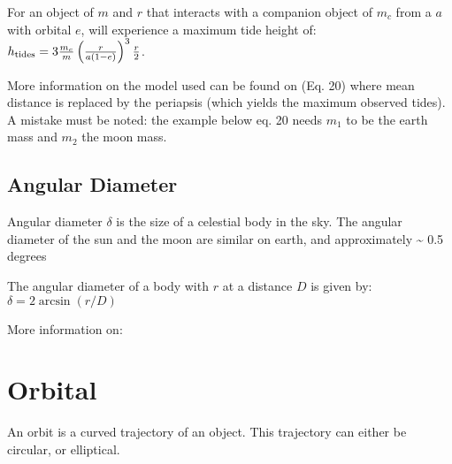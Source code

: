 \documentclass[letterpaper,10pt,english]{sphinxmanual}
\begin{document}
\sphinxAtStartPar
For an object of {\hyperref[\detokenize{quantities/material/mass:id1}]{}} \(m\) and {\hyperref[\detokenize{quantities/geometric/radius:id1}]{}} \(r\)
that interacts with a companion object of {\hyperref[\detokenize{quantities/material/mass:id1}]{}} \(m_c\)
from a {\hyperref[\detokenize{quantities/orbital/semi_major_axis:id1}]{}} \(a\)
with orbital {\hyperref[\detokenize{quantities/orbital/eccentricity:id1}]{}} \(e\),
will experience a maximum tide height of:
\(h_{\rm tides} = 3 \frac{m_c}{m} \left(\frac{r}{a (1 - e)}\right)^3 \frac{r}{2}\).

\sphinxAtStartPar
More information on the model used can be found on
 (Eq. 20)
where mean distance is replaced by the periapsis (which yields the maximum observed tides).
A mistake must be noted: the example below eq. 20 needs \(m_1\) to be the earth mass
and \(m_2\) the moon mass.


\subsection{Angular Diameter}
\label{\detokenize{quantities/surface/angular_diameter:angular-diameter}}\label{\detokenize{quantities/surface/angular_diameter::doc}}\label{\detokenize{quantities/surface/angular_diameter:id1}}
\sphinxAtStartPar
Angular diameter \(\delta\) is the size of a celestial body in the sky. The angular diameter of the sun and the moon are
similar on earth, and approximately \textasciitilde{} 0.5 degrees

\sphinxAtStartPar
The angular diameter of a body with {\hyperref[\detokenize{quantities/geometric/radius:id1}]{}} \(r\) at a distance \(D\)
is given by: \(\delta = 2 \arcsin(r/D)\)

\sphinxAtStartPar
More information on: 


\section{Orbital}
\label{\detokenize{quantities/orbital/orbital:orbital}}\label{\detokenize{quantities/orbital/orbital::doc}}\label{\detokenize{quantities/orbital/orbital:id1}}
\sphinxAtStartPar
An orbit is a curved trajectory of an object. This trajectory can either be circular, or elliptical.
\end{document}

